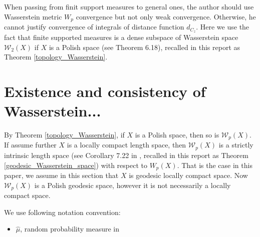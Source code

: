 \begin{rmk}
	When passing from finit support measures to general ones, the author should use Wasserstein metric $W_p$ convergence but not only weak convergence. Otherwise, he cannot justify convergence of integrals of distance function $d_{C_z}$. Here we use the fact that finite supported measures is a dense subspace of Wasserstein space $\mathscr{W}_2(X)$ if $X$ is a Polish space (see \cite{villani2008optimal} Theorem 6.18), recalled in this report as Theorem \ref{topology_Wasserstein}.
\end{rmk}
\section{Existence and consistency of Wasserstein...}
By Theorem \ref{topology_Wasserstein}, if $X$ is a Polish space, then so is $\mathscr{W}_p(X)$. If assume further $X$ is a locally compact length space, then $\mathscr{W}_p(X)$ is a strictly intrinsic length space (see Corollary 7.22 in \cite{villani2008optimal}, recalled in this report as Theorem \ref{geodesic_Wasserstein_space}) with respect to $W_p(X)$. That is the case in this paper, we assume in this section that $X$ is geodesic locally compact space. Now $\mathscr{W}_p(X)$ is a Polish geodesic space, however it is not necessarily a locally compact space.

We use following notation convention:
\begin{itemize}
	\item \( \hat{\mu} \), random probability measure in
\end{itemize}
